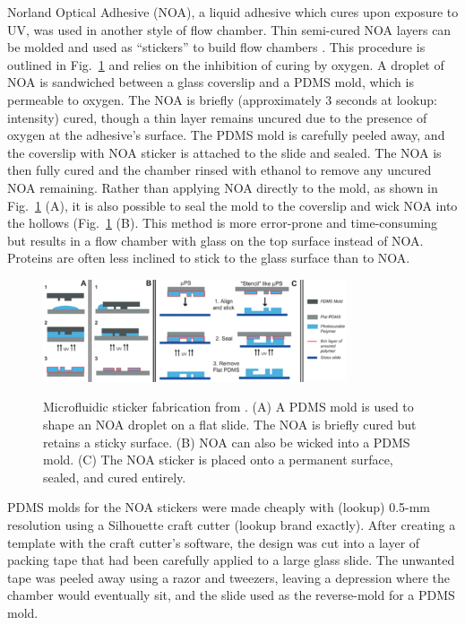 Norland Optical Adhesive (NOA), a liquid adhesive which cures upon exposure to UV, was used in another style of flow chamber.  Thin semi-cured NOA layers can be molded and used as ``stickers'' to build flow chambers \cite{bartolo08, paustian13}.  This procedure is outlined in Fig.~\ref{fig:stickers} and relies on the inhibition of curing by oxygen.  A droplet of NOA is sandwiched between a glass coverslip and a PDMS mold, which is permeable to oxygen. The NOA is briefly (approximately 3 seconds at lookup: intensity) cured, though a thin layer remains uncured due to the presence of oxygen at the adhesive's surface. The PDMS mold is carefully peeled away, and the coverslip with NOA sticker is attached to the slide and sealed.  The NOA is then fully cured and the chamber rinsed with ethanol to remove any uncured NOA remaining. Rather than applying NOA directly to the mold, as shown in Fig.~\ref{fig:stickers} (A), it is also possible to seal the mold to the coverslip and wick NOA into the hollows (Fig.~\ref{fig:stickers} (B).  This method is more error-prone and time-consuming but results in a flow chamber with glass on the top surface instead of NOA.  Proteins are often less inclined to stick to the glass surface than to NOA.

\begin{figure}
\caption{Microfluidic sticker fabrication from \cite{bartolo08}. (A) A PDMS mold is used to shape an NOA droplet on a flat slide.  The NOA is briefly cured but retains a sticky surface.  (B) NOA can also be wicked into a PDMS mold. (C) The NOA sticker is placed onto a permanent surface, sealed, and cured entirely.}
\centering
\includegraphics[width=0.8\textwidth]{figs/ch03/sticker-bartolo.pdf}
\label{fig:stickers}
\end{figure}

PDMS molds for the NOA stickers were made cheaply with (lookup) 0.5-mm resolution using a Silhouette craft cutter (lookup brand exactly).  After creating a template with the craft cutter's software, the design was cut into a layer of packing tape that had been carefully applied to a large glass slide. The unwanted tape was peeled away using a razor and tweezers, leaving a depression where the chamber would eventually sit, and the slide used as the reverse-mold for a PDMS mold.

